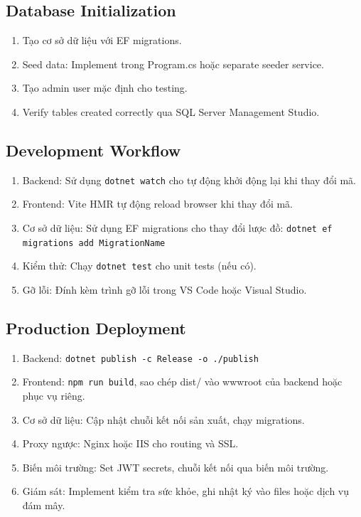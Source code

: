 \documentclass[conference,a4paper]{IEEEtran}
\begin{document}
\subsection{Database Initialization}
\begin{enumerate}
  \item Tạo cơ sở dữ liệu với EF migrations.
  \item Seed data: Implement trong Program.cs hoặc separate seeder service.
  \item Tạo admin user mặc định cho testing.
  \item Verify tables created correctly qua SQL Server Management Studio.
\end{enumerate}

\subsection{Development Workflow}
\begin{enumerate}
  \item Backend: Sử dụng \texttt{dotnet watch} cho tự động khởi động lại khi thay đổi mã.
  \item Frontend: Vite HMR tự động reload browser khi thay đổi mã.
  \item Cơ sở dữ liệu: Sử dụng EF migrations cho thay đổi lược đồ: \texttt{dotnet ef migrations add MigrationName}
  \item Kiểm thử: Chạy \texttt{dotnet test} cho unit tests (nếu có).
  \item Gỡ lỗi: Đính kèm trình gỡ lỗi trong VS Code hoặc Visual Studio.
\end{enumerate}

\subsection{Production Deployment}
\begin{enumerate}
  \item Backend: \texttt{dotnet publish -c Release -o ./publish}
  \item Frontend: \texttt{npm run build}, sao chép dist/ vào wwwroot của backend hoặc phục vụ riêng.
  \item Cơ sở dữ liệu: Cập nhật chuỗi kết nối sản xuất, chạy migrations.
  \item Proxy ngược: Nginx hoặc IIS cho routing và SSL.
  \item Biến môi trường: Set JWT secrets, chuỗi kết nối qua biến môi trường.
  \item Giám sát: Implement kiểm tra sức khỏe, ghi nhật ký vào files hoặc dịch vụ đám mây.
\end{enumerate}
\end{document}

